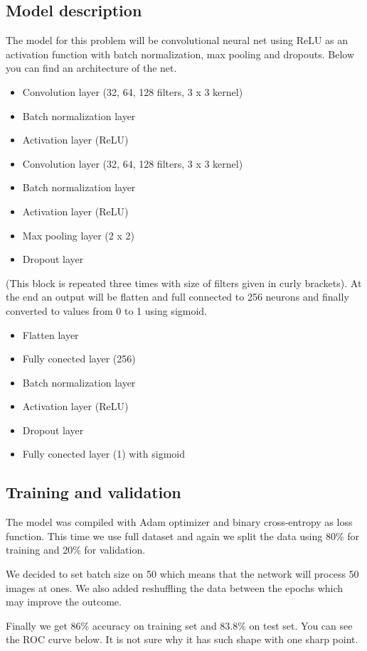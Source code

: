 \documentclass[12pt, a4paper]{article}
\begin{document}
\subsection*{Model description}
\noindent
The model for this problem will be convolutional neural net using ReLU as an activation function with batch normalization, max pooling and dropouts. Below you can find an architecture of the net.
\begin{itemize}
	\item Convolution layer ({32, 64, 128} filters, 3 x 3 kernel)
	\item Batch normalization layer
	\item Activation layer (ReLU)
	\item Convolution layer ({32, 64, 128} filters, 3 x 3 kernel)
	\item Batch normalization layer
	\item Activation layer (ReLU)
	\item Max pooling layer (2 x 2)
	\item Dropout layer
\end{itemize}
(This block is repeated three times with size of filters given in curly brackets). At the end an output will be flatten and full connected to 256 neurons and finally converted to values from 0 to 1 using sigmoid.
\begin{itemize}
	\item Flatten layer
	\item Fully conected layer (256)
	\item Batch normalization layer
	\item Activation layer (ReLU)
	\item Dropout layer
	\item Fully conected layer (1) with sigmoid
\end{itemize}

\subsection*{Training and validation}
\noindent
The model was compiled with Adam optimizer and binary cross-entropy as loss function. This time we use full dataset and again we split the data using 80\% for training and 20\% for validation.

\noindent
We decided to set batch size on 50 which means that the network will process 50 images at ones. We also added reshuffling the data between the epochs which may improve the outcome.

\noindent
Finally we get $ 86\% $ accuracy on training set and $ 83.8\% $ on test set. You can see the ROC curve below. It is not sure why it has such shape with one sharp point.
\end{document}

